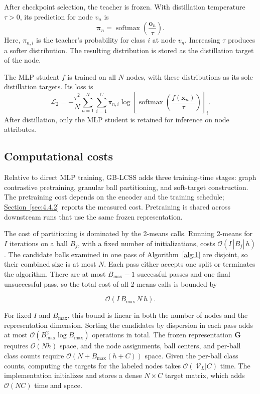 \documentclass[a4paper,fleqn]{cas-sc}
\theoremstyle{definition}
\theoremstyle{plain}
\begin{document}
After checkpoint selection, the teacher is frozen. With distillation temperature \(\tau>0\), its prediction for node \(v_n\) is
\begin{equation}\label{eq:20}
\boldsymbol\pi_n=\operatorname{softmax}\left(\frac{\mathbf o_n}{\tau}\right).
\end{equation}
Here, \(\pi_{n,i}\) is the teacher's probability for class \(i\) at node \(v_n\). Increasing \(\tau\) produces a softer distribution. The resulting distribution is stored as the distillation target of the node.

The MLP student \(f\) is trained on all \(N\) nodes, with these distributions as its sole distillation targets. Its loss is
\begin{equation}\label{eq:21}
\mathcal L_2=-\frac{\tau^2}{N}\sum_{n=1}^{N}\sum_{i=1}^C\pi_{n,i}
\log\left[\operatorname{softmax}\left(\frac{f(\mathbf x_n)}{\tau}\right)\right]_i.
\end{equation}
After distillation, only the MLP student is retained for inference on node attributes.

\subsection{Computational costs}\label{sec:3.6}

Relative to direct MLP training, GB-LCSS adds three training-time stages: graph contrastive pretraining, granular ball partitioning, and soft-target construction. The pretraining cost depends on the encoder and the training schedule; \hyperref[sec:4.4.2]{Section~\ref*{sec:4.4.2}} reports the measured cost. Pretraining is shared across downstream runs that use the same frozen representation.


The cost of partitioning is dominated by the 2-means calls. Running 2-means for \(I\) iterations on a ball \(B_j\), with a fixed number of initializations, costs \(\mathcal{O}(I\,|B_j|\,h)\). The candidate balls examined in one pass of Algorithm~\ref{alg:1} are disjoint, so their combined size is at most \(N\). Each pass either accepts one split or terminates the algorithm. There are at most \(B_{\max}-1\) successful passes and one final unsuccessful pass, so the total cost of all 2-means calls is bounded by

\begin{equation}\label{eq:22}
\mathcal{O}(I\,B_{\max}\,N\,h).
\end{equation}

For fixed \(I\) and \(B_{\max}\), this bound is linear in both the number of nodes and the representation dimension. Sorting the candidates by dispersion in each pass adds at most \(\mathcal{O}(B_{\max}^{2}\log B_{\max})\) operations in total. The frozen representation \(\mathbf G\) requires \(\mathcal{O}(Nh)\) space, and the node assignments, ball centers, and per-ball class counts require \(\mathcal{O}(N + B_{\max}(h + C))\) space. Given the per-ball class counts, computing the targets for the labeled nodes takes \(\mathcal{O}(|\mathcal{V}_{L}|C)\) time. The implementation initializes and stores a dense \(N \times C\) target matrix, which adds \(\mathcal{O}(NC)\) time and space.
\end{document}

